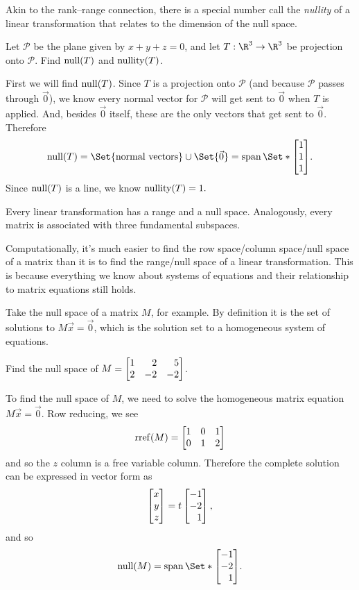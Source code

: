 Akin to the rank--range connection, there is a special number call the \emph{nullity} of a linear transformation
that relates to the dimension of the null space.


\begin{example}
	Let $\mathcal P$ be the plane given by $x+y+z=0$, and let $T:\R^3\to\R^3$ be projection onto $\mathcal P$.
	Find $\operatorname{null}(T)$ and $\operatorname{nullity}(T)$.

	First we will find $\operatorname{null}(T)$. Since $T$ is a projection onto $\mathcal P$ (and because $\mathcal P$ passes
	through $\vec 0$), we know every normal vector for $\mathcal P$ will get sent to $\vec 0$ when $T$ is applied.
	And, besides $\vec 0$ itself, these are the only vectors that get sent to $\vec 0$. Therefore
	\[
		\Null(T)=\Set{\text{normal vectors}}\cup\Set{\vec 0}=\Span\Set*{\mat{1\\1\\1}}.
	\]
	Since $\operatorname{null}(T)$ is a line, we know
	$
		\operatorname{nullity}(T)=1.
	$
\end{example}

Every linear transformation has a range and a null space. Analogously, every matrix is associated with
three fundamental subspaces.


Computationally, it's much easier to find the row space/column space/null space of a matrix than it is
to find the range/null space of a linear transformation. This is because everything we know about
systems of equations and their relationship to matrix equations still holds.

Take the null space of a matrix $M$, for example. By definition it is the set of solutions to
$M\vec x=\vec 0$, which is the solution set to a homogeneous system of equations.

\begin{example}
	Find the null space of $M=\mat{1&2&5\\2&-2&-2}$.

	To find the null space of $M$, we need to solve the homogeneous matrix equation $M\vec x=\vec 0$.
	Row reducing, we see
	\[
		\Rref(M)=\mat{1&0&1\\0&1&2}
	\]
	and so the $z$ column is a free variable column. Therefore the complete solution can be expressed in
	vector form as
	\[
		\mat{x\\y\\z}=t\mat{-1\\-2\\1},
	\]
	and so
	\[
		\Null(M)=\Span\Set*{\mat{-1\\-2\\1}}.
	\]
\end{example}

